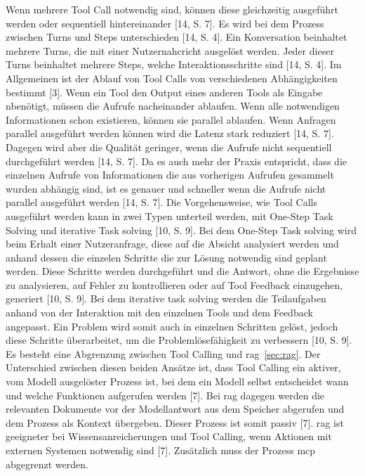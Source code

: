 Wenn mehrere Tool Call notwendig sind, können diese gleichzeitig ausgeführt werden oder sequentiell hintereinander [14, S. 7]. Es wird bei dem Prozess zwischen 
Turns und Steps unterschieden [14, S. 4]. Ein Konversation beinhaltet mehrere Turns, die mit einer Nutzernahcricht ausgelöst werden. Jeder dieser Turns beinhaltet
mehrere Steps, welche Interaktionsschritte sind [14, S. 4]. Im Allgemeinen ist der Ablauf von Tool Calls von verschiedenen Abhängigkeiten bestimmt [3]. Wenn ein 
Tool den Output eines anderen Tools als Eingabe nbenötigt, müssen die Aufrufe nacheinander ablaufen. Wenn alle notwendigen Informationen schon existieren, können sie 
parallel ablaufen. Wenn Anfragen parallel ausgeführt werden können wird die Latenz stark reduziert [14, S. 7]. Dagegen wird aber die Qualität geringer, wenn die 
Aufrufe nicht sequentiell durchgeführt werden [14, S. 7]. Da es auch mehr der Praxis entspricht, dass die einzelnen Aufrufe von Informationen die aus vorherigen 
Aufrufen gesammelt wurden abhängig sind, ist es genauer und schneller wenn die Aufrufe nicht parallel ausgeführt werden [14, S. 7]. Die Vorgehensweise, wie Tool 
Calls ausgeführt werden kann in zwei Typen unterteil werden, mit One-Step Task Solving und iterative Task solving [10, S. 9]. Bei dem One-Step Task solving wird
beim Erhalt einer Nutzeranfrage, diese auf die Absicht analysiert werden und anhand dessen die einzelen Schritte die zur Lösung notwendig sind geplant werden. 
Diese Schritte werden durchgeführt und die Antwort, ohne die Ergebnisse zu analysieren, auf Fehler zu kontrollieren oder auf Tool Feedback einzugehen, generiert 
[10, S. 9]. Bei dem iterative task solving werden die Teilaufgaben anhand von der Interaktion mit den einzelnen Tools und dem Feedback angepasst. Ein Problem wird
somit auch in einzelnen Schritten gelöst, jedoch diese Schritte überarbeitet, um die Problemlösefähigkeit zu verbessern [10, S. 9]. \\
Es besteht eine Abgrenzung zwischen Tool Calling und \ac{rag}~\ref{sec:rag}. Der Unterschied zwischen diesen beiden Ansätze ist, dass Tool Calling ein aktiver, 
vom Modell ausgelöster Prozess ist, bei dem ein Modell selbst entscheidet wann und welche Funktionen aufgerufen werden [7]. Bei \ac{rag} dagegen werden die relevanten
Dokumente vor der Modellantwort aus dem Speicher abgerufen und dem Prozess als Kontext übergeben. Dieser Prozess ist somit passiv [7]. \ac{rag} ist geeigneter 
bei Wissensanreicherungen und Tool Calling, wenn Aktionen mit externen Systemen notwendig sind [7]. Zusätzlich muss der Prozess \ac{mcp} abgegrenzt werden. 
